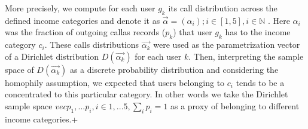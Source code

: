 More precisely, we compute for each user $g_k$ its call distribution across the defined income categories and denote it as $\vec{\alpha} =(\alpha_i); i \in [1,5], i\in \mathbb{N}$ . Here $\alpha_i$ was the fraction of outgoing callas records ($p_k$) that user $g_k$ has to the income category $c_i$. These calls distributions $\vec{\alpha_k}$ were used as the parametrization vector of a Dirichlet distribution $D(\vec{\alpha_k})$ for each user $k$. Then, interpreting the sample space of $D(\vec{\alpha_k})$ as a discrete probability distribution and considering the homophily assumption,  we expected that users belonging to $c_i$ tends to be a concentrated to this particular category. In other words we take the Dirichlet sample space $vec{p_1,...p_i}, i\in 1,...5, \sum_i{p_i}=1$ as a proxy of belonging to different income categories.+
\\

